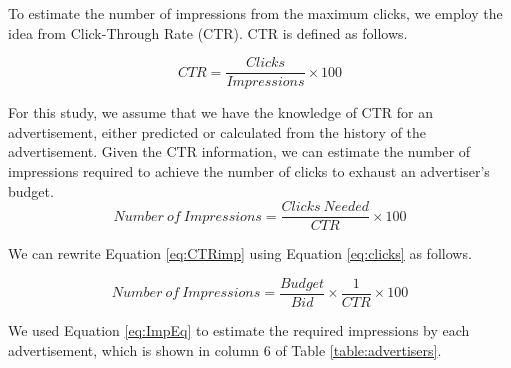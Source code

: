 To estimate the number of impressions from the maximum clicks, we employ the idea from Click-Through Rate (CTR). CTR is defined as follows.

\begin{equation}
CTR = \frac{Clicks}{Impressions} \times 100
\label{eq:CTR}
\end{equation}

For this study, we assume that we have the knowledge of CTR for an advertisement, either predicted or calculated from the history of the advertisement. Given the CTR information, we can estimate the number of impressions required to achieve the number of clicks to exhaust an advertiser's budget.
\begin{equation}
 Number\ of\ Impressions = \frac{Clicks\ Needed }{CTR} \times 100 
\label{eq:CTRimp}
\end{equation}

We can rewrite Equation \ref{eq:CTRimp} using Equation \ref{eq:clicks} as follows.

\begin{equation}
 Number\ of\ Impressions = \frac{Budget}{Bid} \times \frac{1}{CTR} \times 100
    \label{eq:ImpEq}
\end{equation}


We used Equation \ref{eq:ImpEq} to estimate the required impressions by each advertisement, which is shown in column 6 of Table \ref{table:advertisers}.\par

\begin{table}

\centering

\caption{Table Showing Advertisements Details \label{table:advertisers}}
\end{table}





